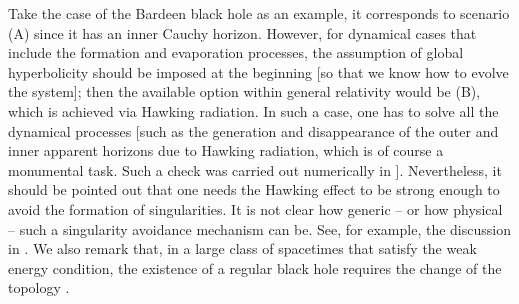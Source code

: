 \documentclass[12pt]{article}
\newcommand{\2}{$^2$}
\newcommand{\3}{$^3$}
\newcommand{\4}{$_4$}
\newcommand{\5}{$_5$}
\begin{document}
Take the case of the Bardeen black hole as an example, it corresponds to scenario (A) since it has an inner Cauchy horizon. However, for dynamical cases that include the formation and evaporation processes, the assumption of global hyperbolicity should be imposed at the beginning [so that we know how to evolve the system]; then the available option within general relativity would be (B), which is achieved via Hawking radiation. In such a case, one has to solve all the dynamical processes [such as the generation and disappearance of the outer and inner apparent horizons due to Hawking radiation, which is of course a monumental task. Such a check was carried out numerically in \cite{Hwang:2012nn}]. {\color{black}Nevertheless, it should be pointed out that one needs the Hawking effect to be strong enough to avoid the formation of singularities. It is not clear how generic -- or how physical -- such a singularity avoidance mechanism can be. See, for example, the discussion in \cite{roman}. We also remark that, in a large class of spacetimes that satisfy the weak energy condition, the existence of a regular black hole requires the change of the topology \cite{9612057}.}
\end{document}
